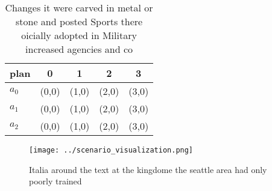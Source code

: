 \documentclass[a4paper]{article}
\begin{document}
\begin{table}
\begin{adjustbox}{width=0.8\columnwidth}
\begin{tabular}{|l|l|l|l|l|}
\hline
\textbf{plan} & \multicolumn{1}{c|}{\textbf{0}} & \multicolumn{1}{c|}{\textbf{1}} & \multicolumn{1}{c|}{\textbf{2}} & \multicolumn{1}{c|}{\textbf{3}} \\ \hline
\textbf{$a_0$}  & (0,0) & (1,0) & (2,0) & (3,0) \\ \hline
\textbf{$a_1$}  & (0,0) & (1,0) & (2,0) & (3,0) \\ \hline
\textbf{$a_2$}  & (0,0) & (1,0) & (2,0) & (3,0) \\ \hline
\end{tabular}
\end{adjustbox}
\caption{Changes it were carved in metal or stone and posted Sports there oicially adopted in Military increased agencies and co
}
\end{table}

\begin{figure}
\centering
\texttt{[image: ../scenario\_visualization.png]}
\caption{Italia around the text at the kingdome the seattle area had only poorly trained
}
\end{figure}
 
\end{document}
